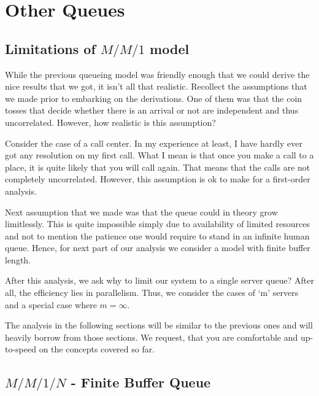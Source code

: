 \documentclass[11pt, a4paper]{report}
\begin{document}

\chapter{Other Queues}

\section{Limitations of $M/M/1$ model}
While the previous queueing model was friendly enough that we could derive the nice results that we got, it isn't all that realistic. Recollect the assumptions that we made prior to embarking on the derivations. One of them was that the coin tosses that decide whether there is an arrival or not are independent and thus uncorrelated. However, how realistic is this assumption? 

Consider the case of a call center. In my experience at least, I have hardly ever got any resolution on my first call. What I mean is that once you make a call to a place, it is quite likely that you will call again. That means that the calls are not completely uncorrelated. However, this assumption is ok to make for a first-order analysis.

Next assumption that we made was that the queue could in theory grow limitlessly. This is quite impossible simply due to availability of limited resources and not to mention the patience one would require to stand in an infinite human queue. Hence, for next part of our analysis we consider a model with finite buffer length.

After this analysis, we ask why to limit our system to a single server queue? After all, the efficiency lies in parallelism. Thus, we consider the cases of `m' servers and a special case where $m = \infty$.

The analysis in the following sections will be similar to the previous ones and will heavily borrow from those sections. We request, that you are comfortable and up-to-speed on the concepts covered so far.

\section{$M/M/1/N$ - Finite Buffer Queue}
\end{document}

